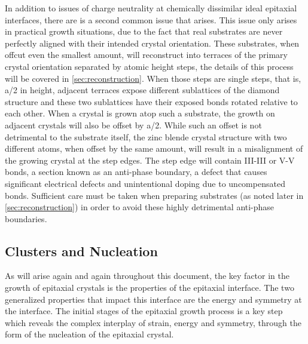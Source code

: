 In addition to issues of charge neutrality at chemically dissimilar ideal epitaxial interfaces, there are is a second common issue that arises. This issue only arises in practical growth situations, due to the fact that real substrates are never perfectly aligned with their intended crystal orientation. These substrates, when offcut even the smallest amount, will reconstruct into terraces of the primary crystal orientation separated by atomic height steps, the details of this process will be covered in \cref{sec:reconstruction}. When those steps are single steps, that is, a/2 in height, adjacent terraces expose different sublattices of the diamond structure and these two sublattices have their exposed bonds rotated relative to each other. When a crystal is grown atop such a substrate, the growth on adjacent crystals will also be offset by a/2. While such an offset is not detrimental to the substrate itself, the zinc blende crystal structure with two different atoms, when offset by the same amount, will result in a misalignment of the growing crystal at the step edges. The step edge will contain III-III or V-V bonds, a section known as an anti-phase boundary, a defect that causes significant electrical defects and unintentional doping due to uncompensated bonds. Sufficient care must be taken when preparing substrates (as noted later in \cref{sec:reconstruction}) in order to avoid these highly detrimental anti-phase boundaries.

\subsection{Clusters and Nucleation}
As will arise again and again throughout this document, the key factor in the growth of epitaxial crystals is the properties of the epitaxial interface. The two generalized properties that impact this interface are the energy and symmetry at the interface. The initial stages of the epitaxial growth process is a key step which reveals the complex interplay of strain, energy and symmetry, through the form of the nucleation of the epitaxial crystal.

